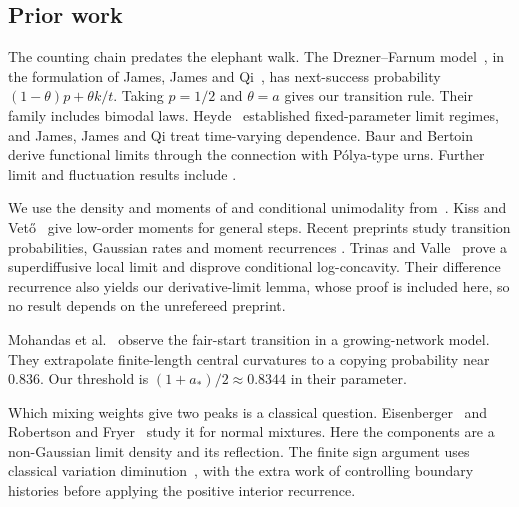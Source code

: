 \subsection{Prior work}\label{sec:prior}

The counting chain predates the elephant walk. The Drezner--Farnum
model~\cite{dreznerfarnum1993}, in the formulation of
James, James and Qi~\cite[p.~2339]{jamesjamesqi2008}, has
next-success probability $(1-\theta)p+\theta k/t$.
Taking $p=1/2$ and $\theta=a$ gives our transition rule.
Their family includes bimodal laws. Heyde~\cite{heyde2004}
established fixed-parameter limit regimes, and James, James and
Qi treat time-varying dependence. Baur and Bertoin~\cite{baurbert2016}
derive functional limits through the connection with P\'olya-type
urns. Further limit and fluctuation results include
\cite{coletti2017,bercu2018,kubotatakei2019}.

We use the density and moments of
\cite[Theorems~1.3 and~1.4]{glr2026} and conditional unimodality
from~\cite[Theorem~1.1]{glrs2025}.
Kiss and Vet\H{o}~\cite{kissveto2022} give low-order moments for
general steps. Recent preprints study transition probabilities,
Gaussian rates and moment recurrences
\cite{peresqin2026,muraharatokumitsu2026,vishwakarma2026}.
Trinas and Valle~\cite{tv2026} prove a superdiffusive local limit
and disprove conditional log-concavity. Their difference recurrence
also yields our derivative-limit lemma, whose proof is included
here, so no result depends on the unrefereed preprint.

Mohandas et al.~\cite[Supplemental Material, Section~IV.A]{mohandas2025}
observe the fair-start transition in a growing-network model.
They extrapolate finite-length central curvatures to a copying
probability near $0.836$. Our threshold is
$(1+a_*)/2\approx0.8344$ in their parameter.

Which mixing weights give two peaks is a classical question.
Eisenberger~\cite{eisenberger1964} and Robertson and
Fryer~\cite{robertsonfryer1969} study it for normal mixtures.
Here the components are a non-Gaussian limit density and its
reflection. The finite sign argument uses classical variation
diminution~\cite{karlin1964,karlin1968}, with the extra work of
controlling boundary histories before applying the positive
interior recurrence.
